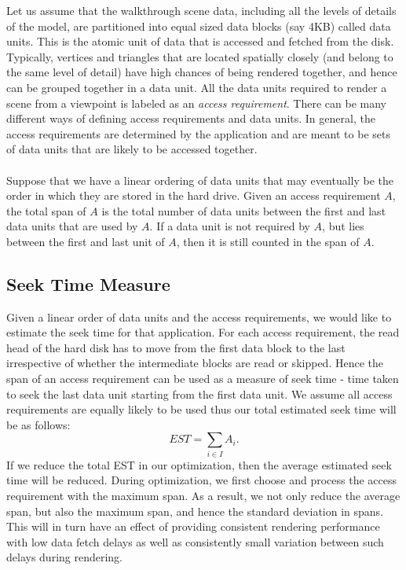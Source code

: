 Let us assume that the walkthrough scene data, including all the levels of
details of the model, are partitioned into equal sized data blocks (say 4KB)
called data units. This is the atomic unit of data that is accessed and fetched
from the disk. Typically, vertices and triangles that are located spatially
closely (and belong to the same level of detail) have high chances of being
rendered together, and hence can be grouped together in a data unit. All the
data units required to render a scene from a viewpoint is labeled as an {\em
access requirement}. There can be many different ways of defining access requirements and data
units.  In general,
the access requirements are determined by the application and are meant to be
sets of data units that are likely to be accessed together. \\
\\
Suppose that we have a linear ordering of data units that may eventually be the
order in which they are stored in the hard drive.  Given an access requirement
$A$, the total span of $A$ is the total number of data units between the first
and last data units that are used by $A$. If a data unit is not required by $A$, but
lies between the first and last unit of $A$, then it is still counted in the
span of $A$. 

\subsection{Seek Time Measure}

Given a linear order of data units and the access requirements, we would like to
estimate the seek time for that application.  For each access requirement, the
read head of the hard disk has to move from the first data block to the last
irrespective of whether the intermediate blocks are read or skipped. Hence the
span of an access requirement can be used as a measure of seek time - time
taken to seek the last data unit starting from the first data unit. We assume all access requirements are equally likely to be used thus 
our total estimated seek time will be as follows:
\[
EST = \sum_{i \in I}{A_i}.
\]
If we reduce the total EST in our optimization, then the average estimated seek time will be reduced. During optimization, we first  choose and process the access requirement with the maximum span. As a result, we not only reduce the average span, but also the maximum span, and hence the standard deviation in spans. This will in turn have an effect of providing consistent rendering performance with low data fetch delays as well as consistently small variation between such delays during rendering. 



